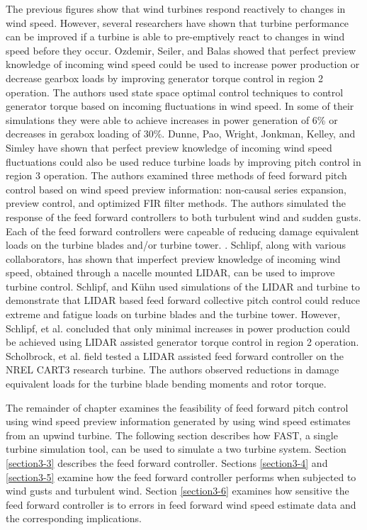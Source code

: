 The previous figures show that wind turbines respond reactively to changes in wind speed. However, several researchers have shown that turbine performance can be improved if a turbine is able to pre-emptively react to changes in wind speed before they occur. Ozdemir, Seiler, and Balas showed that perfect preview knowledge of incoming wind speed could be used to increase power production or decrease gearbox loads by improving generator torque control in region 2 operation. The authors used state space optimal control techniques to control generator torque based on incoming fluctuations in wind speed. In some of their simulations they were able to achieve increases in power generation of 6\% or decreases in gerabox loading of 30\%.\cite{ozdemir2013} Dunne, Pao, Wright, Jonkman, Kelley, and Simley have shown that perfect preview knowledge of incoming wind speed fluctuations could also be used reduce turbine loads by improving pitch control in region 3 operation. The authors examined three methods of feed forward pitch control based on wind speed preview information: non-causal series expansion, preview control, and optimized FIR filter methods. The authors simulated the response of the feed forward controllers to both turbulent wind and sudden gusts. Each of the feed forward controllers were capeable of reducing damage equivalent loads on the turbine blades and/or turbine tower. \cite{dunne2011}. Schlipf, along with various collaborators, has shown that imperfect preview knowledge of incoming wind speed, obtained through a nacelle mounted LIDAR, can be used to improve turbine control.\cite{schlipf2008,schlipf2010,schlipf2011,schlipf2011a,schlipf2013} Schlipf, and K{\"u}hn used simulations of the LIDAR and turbine to demonstrate that LIDAR based feed forward collective pitch control could reduce extreme and fatigue loads on turbine blades and the turbine tower. \cite{schlipf2013} However, Schlipf, et al. concluded that only minimal increases in power production could be achieved using LIDAR assisted generator torque control in region 2 operation.\cite{schlipf2011a}  Scholbrock, et al. field tested a LIDAR assisted feed forward controller on the NREL CART3 research turbine. The authors observed reductions in damage equivalent loads for the turbine blade bending moments and rotor torque. \cite{scholbrock2013}

The remainder of chapter examines the feasibility of feed forward pitch control using wind speed preview information generated by using wind speed estimates from an upwind turbine. The following section describes how FAST, a single turbine simulation tool, can be used to simulate a two turbine system. Section \ref{section3-3} describes the feed forward controller. Sections \ref{section3-4} and \ref{section3-5} examine how the feed forward controller performs when subjected to wind gusts and turbulent wind. Section \ref{section3-6} examines how sensitive the feed forward controller is to errors in feed forward wind speed estimate data and the corresponding implications.



